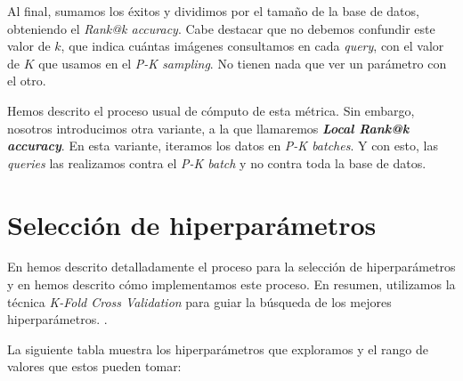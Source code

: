 Al final, sumamos los éxitos y dividimos por el tamaño de la base de datos, obteniendo el \textit{Rank@k accuracy}. Cabe destacar que no debemos confundir este valor de $k$, que indica cuántas imágenes consultamos en cada \textit{query}, con el valor de $K$ que usamos en el \textit{P-K sampling}. No tienen nada que ver un parámetro con el otro.

Hemos descrito el proceso usual de cómputo de esta métrica. Sin embargo, nosotros introducimos otra variante, a la que llamaremos \textbf{\textit{Local Rank@k accuracy}}. En esta variante, iteramos los datos en \textit{P-K batches}. Y con esto, las \textit{queries} las realizamos contra el \textit{P-K batch} y no contra toda la base de datos.

\section{Selección de hiperparámetros} \label{isec:experimentacion_hp_tuning}

En  hemos descrito detalladamente el proceso para la selección de hiperparámetros y en  hemos descrito cómo implementamos este proceso. En resumen, utilizamos la técnica \textit{K-Fold Cross Validation} para guiar la búsqueda de los mejores hiperparámetros.
.

La siguiente tabla muestra los hiperparámetros que exploramos y el rango de valores que estos pueden tomar:

